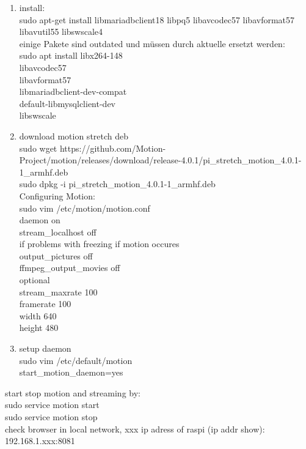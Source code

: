 \begin{enumerate}
	\item install:\\
	sudo apt-get install libmariadbclient18 libpq5 libavcodec57  libavformat57 libavutil55 libswscale4\\
	einige Pakete sind outdated und müssen durch aktuelle ersetzt werden:\\
	sudo apt install libx264-148\\
	libavcodec57\\
	libavformat57\\
	libmariadbclient-dev-compat\\
	default-libmysqlclient-dev\\
	libswscale

	\item download motion stretch deb\\
	sudo wget https://github.com/Motion-Project/motion/releases/download/release-4.0.1/pi\_stretch\_motion\_4.0.1-1\_armhf.deb\\
	sudo dpkg -i pi\_stretch\_motion\_4.0.1-1\_armhf.deb\\

	Configuring Motion:\\
	sudo vim /etc/motion/motion.conf\\
	daemon on\\
	stream\_localhost off\\
	if problems with freezing if motion occures\\
	output\_pictures off\\
	ffmpeg\_output\_movies off\\
	optional\\
	stream\_maxrate 100\\
	framerate 100\\
	width 640\\
	height 480

	\item setup daemon\\
	sudo vim /etc/default/motion\\
	start\_motion\_daemon=yes
\end{enumerate}

start stop motion and streaming by:\\
sudo service motion start\\
sudo service motion stop\\

check browser in local network, xxx ip adress of raspi (ip addr show):\\
192.168.1.xxx:8081

